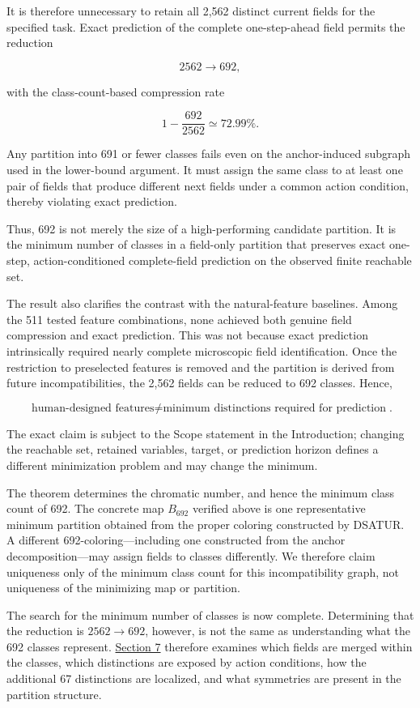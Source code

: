 \documentclass[
  11pt,
]{article}
\begin{document}
It is therefore unnecessary to retain all 2,562 distinct current fields
for the specified task. Exact prediction of the complete one-step-ahead
field permits the reduction

\[{2562\longrightarrow692,}\]

with the class-count-based compression rate

\[{1-\frac{692}{2562}\simeq72.99\%.}\]

Any partition into 691 or fewer classes fails even on the anchor-induced
subgraph used in the lower-bound argument. It must assign the same class
to at least one pair of fields that produce different next fields under
a common action condition, thereby violating exact prediction.

Thus, 692 is not merely the size of a high-performing candidate
partition. It is the minimum number of classes in a field-only partition
that preserves exact one-step, action-conditioned complete-field
prediction on the observed finite reachable set.

The result also clarifies the contrast with the natural-feature
baselines. Among the 511 tested feature combinations, none achieved both
genuine field compression and exact prediction. This was not because
exact prediction intrinsically required nearly complete microscopic
field identification. Once the restriction to preselected features is
removed and the partition is derived from future incompatibilities, the
2,562 fields can be reduced to 692 classes. Hence,

\[{\boxed{\text{human-designed features}\neq\text{minimum distinctions required for prediction}}.}\]

The exact claim is subject to the Scope statement in the Introduction;
changing the reachable set, retained variables, target, or prediction
horizon defines a different minimization problem and may change the
minimum.

The theorem determines the chromatic number, and hence the minimum class
count of 692. The concrete map \({B_{692}}\) verified above is one
representative minimum partition obtained from the proper coloring
constructed by DSATUR. A different 692-coloring---including one
constructed from the anchor decomposition---may assign fields to classes
differently. We therefore claim uniqueness only of the minimum class
count for this incompatibility graph, not uniqueness of the minimizing
map or partition.

The search for the minimum number of classes is now complete.
Determining that the reduction is \({2562\to692}\), however, is not the
same as understanding what the 692 classes represent. \hyperref[structure-and-interpretation-of-the-minimum-partition]{Section 7}
therefore examines which fields are merged within the classes, which
distinctions are exposed by action conditions, how the additional 67
distinctions are localized, and what symmetries are present in the
partition structure.
\end{document}
